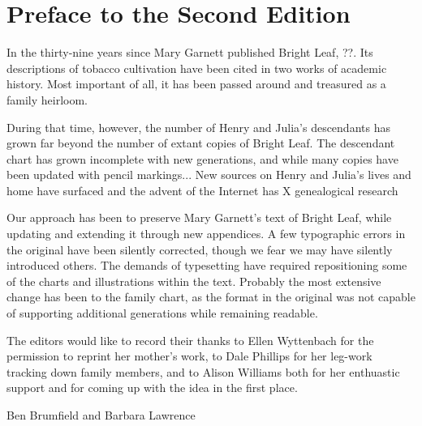 
\chapter{Preface to the Second Edition}


In the thirty-nine years since Mary Garnett published Bright Leaf, ??.  Its descriptions of tobacco cultivation have been cited in two works of academic history.  Most important of all, it has been passed around and treasured as a family heirloom.

During that time, however, the number of Henry and Julia's descendants has grown far beyond the number of extant copies of Bright Leaf.  The descendant chart has grown incomplete with new generations, and while many copies have been updated with pencil markings...  New sources on Henry and Julia's lives and home have surfaced and the advent of the Internet has X genealogical research

Our approach has been to preserve Mary Garnett's text of Bright Leaf, while updating and extending it through new appendices.  A few typographic errors in the original have been silently corrected, though we fear we may have silently introduced others.  The demands of typesetting have required repositioning some of the charts and illustrations within the text.  Probably the most extensive change has been to the family chart, as the format in the original was not capable of supporting additional generations while remaining readable.

The editors would like to record their thanks to Ellen Wyttenbach for the permission to reprint her mother's work, to Dale Phillips for her leg-work tracking down family members, and to Alison Williams both for her enthuastic support and for coming up with the idea in the first place.

Ben Brumfield and Barbara Lawrence


\pagebreak
